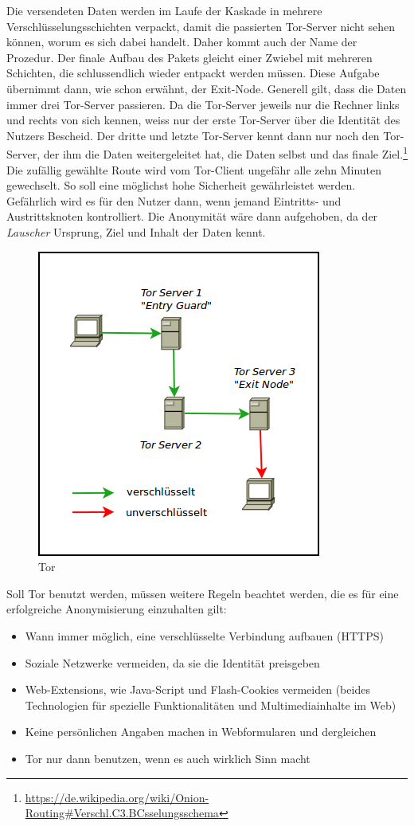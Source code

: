 Die versendeten Daten werden im Laufe der Kaskade in mehrere Verschlüsselungsschichten verpackt, damit die passierten Tor-Server nicht sehen können, worum es sich dabei handelt. Daher kommt auch der Name der Prozedur. Der finale Aufbau des Pakets gleicht einer Zwiebel mit mehreren Schichten, die  schlussendlich wieder entpackt werden müssen. Diese Aufgabe übernimmt dann, wie schon erwähnt, der Exit-Node. Generell gilt, dass die Daten immer drei Tor-Server passieren. Da die Tor-Server jeweils nur die Rechner links und rechts von sich kennen, weiss nur der erste Tor-Server über die Identität des Nutzers Bescheid. Der dritte und letzte Tor-Server kennt dann nur noch den Tor-Server, der ihm die Daten weitergeleitet hat, die Daten selbst und das finale Ziel.\footnote{\url{https://de.wikipedia.org/wiki/Onion-Routing\#Verschl.C3.BCsselungsschema}}
Die zufällig gewählte Route wird vom Tor-Client ungefähr alle zehn Minuten gewechselt. So soll eine möglichst hohe Sicherheit gewährleistet werden. Gefährlich wird es für den Nutzer dann, wenn jemand Eintritts- und Austrittsknoten kontrolliert. Die Anonymität wäre dann aufgehoben, da der \textit{Lauscher} Ursprung, Ziel und Inhalt der Daten kennt.

\begin{figure}[h]
\centering
\includegraphics[scale=0.7]{images/tor}
\caption{Tor}
\end{figure}

Soll Tor benutzt werden, müssen weitere Regeln beachtet werden, die es für eine erfolgreiche Anonymisierung einzuhalten gilt:
\begin{itemize}
\item Wann immer möglich, eine verschlüsselte Verbindung aufbauen (HTTPS)
\item Soziale Netzwerke vermeiden, da sie die Identität preisgeben
\item Web-Extensions, wie Java-Script und Flash-Cookies vermeiden (beides Technologien für spezielle Funktionalitäten und Multimediainhalte im Web)
\item Keine persönlichen Angaben machen in Webformularen und dergleichen
\item Tor nur dann benutzen, wenn es auch wirklich Sinn macht
\end{itemize}

